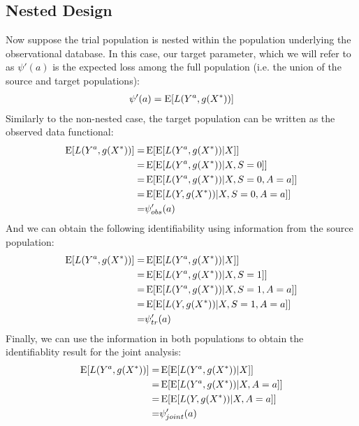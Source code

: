 \documentclass[11pt]{article}
\DeclareMathOperator{\E}{\textnormal{\mbox{E}}}
\begin{document}
\subsection*{Nested Design}
Now suppose the trial population is nested within the population underlying the observational database.  In this case, our target parameter, which we will refer to as $\psi'(a)$ is the expected loss among the full population (i.e. the union of the source and target populations):
\begin{align*}
    \psi'(a) = \E[L(Y^a,g(X^*))]
\end{align*}
Similarly to the non-nested case, the target population can be written as the observed data functional: %
\begin{align*}
   \E[L(Y^a,g(X^*))]
    =&  \E[ \E[L(Y^a,g(X^*))| X] ]\\ %
     =&  \E[ \E[L(Y^a,g(X^*))| X, S=0] ]\\ %
      =&  \E[ \E[L(Y^a,g(X^*))| X,S=0,A=a] ]\\ %
      =&  \E[ \E[L(Y,g(X^*))| X,S=0,A=a] ]\\ %
      =&\psi'_{obs}(a)
\end{align*}
And we can obtain the following identifiability using information from the source population:
\begin{align*}
     \E[L(Y^a,g(X^*))]
    =&  \E[ \E[L(Y^a,g(X^*))| X] ]\\ %
     =&  \E[ \E[L(Y^a,g(X^*))| X, S=1] ]\\ %
      =&  \E[ \E[L(Y^a,g(X^*))| X,S=1,A=a] ]\\ %
      =&  \E[ \E[L(Y,g(X^*))| X,S=1,A=a] ]\\ %
      =&\psi'_{tr}(a)
\end{align*}
Finally, we can use the information in both populations to obtain the identifiablity result for the joint analysis:
\begin{align*}
     \E[L(Y^a,g(X^*))]
    =&  \E[ \E[L(Y^a,g(X^*))| X] ]\\ %
      =&  \E[ \E[L(Y^a,g(X^*))| X,A=a] ]\\ %
      =&  \E[ \E[L(Y,g(X^*))| X,A=a] ]\\ %
      =&\psi'_{joint}(a)
\end{align*}
\end{document}
